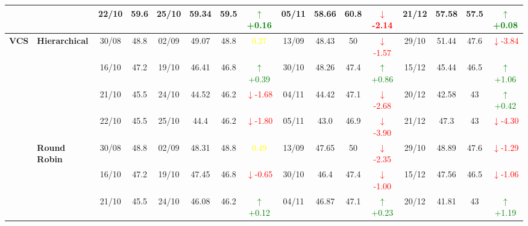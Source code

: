\documentclass{ieeeaccess}
\begin{document}
{\begin{longtable}{llcc|cccc|cccc|cccc}
&
& 22/10 & 59.6 & 25/10 & 59.34 & 59.5 & \textcolor{green}{\(\uparrow\)+0.16} & 05/11 & 58.66 & 60.8 & \textcolor{red}{\(\downarrow\)-2.14} & 21/12 & 57.58 & 57.5 & \textcolor{green}{\(\uparrow\)+0.08} \\
\midrule



\multirow{12}{*}{\textbf{VCS}} 
& \textbf{Hierarchical}
& 30/08 & 48.8 & 02/09 & 49.07 & 48.8 & \textcolor{yellow}{0.27} & 13/09 & 48.43 & 50 & \textcolor{red}{\(\downarrow\)-1.57} & 29/10 & 51.44 & 47.6 & \textcolor{red}{\(\downarrow\)-3.84} \\

&
& 16/10 & 47.2 & 19/10 & 46.41 & 46.8 & \textcolor{green}{\(\uparrow\)+0.39} & 30/10 & 48.26 & 47.4 & \textcolor{green}{\(\uparrow\)+0.86} & 15/12 & 45.44 & 46.5 & \textcolor{green}{\(\uparrow\)+1.06} \\

&
& 21/10 & 45.5 & 24/10 & 44.52 & 46.2 & \textcolor{red}{\(\downarrow\)-1.68} & 04/11 & 44.42 & 47.1 & \textcolor{red}{\(\downarrow\)-2.68} & 20/12 & 42.58 & 43 & \textcolor{green}{\(\uparrow\)+0.42} \\

&
& 22/10 & 45.5 & 25/10 & 44.4 & 46.2 & \textcolor{red}{\(\downarrow\)-1.80} & 05/11 & 43.0 & 46.9 & \textcolor{red}{\(\downarrow\)-3.90} & 21/12 & 47.3 & 43 & \textcolor{red}{\(\downarrow\)-4.30} \\
\cmidrule(lr){2-16}


& \textbf{Round Robin}
& 30/08 & 48.8 & 02/09 & 48.31 & 48.8 & \textcolor{yellow}{0.49} & 13/09 & 47.65 & 50 & \textcolor{red}{\(\downarrow\)-2.35} & 29/10 & 48.89 & 47.6 & \textcolor{red}{\(\downarrow\)-1.29} \\

&
& 16/10 & 47.2 & 19/10 & 47.45 & 46.8 & \textcolor{red}{\(\downarrow\)-0.65} & 30/10 & 46.4 & 47.4 & \textcolor{red}{\(\downarrow\)-1.00} & 15/12 & 47.56 & 46.5 & \textcolor{red}{\(\downarrow\)-1.06} \\

&
& 21/10 & 45.5 & 24/10 & 46.08 & 46.2 & \textcolor{green}{\(\uparrow\)+0.12} & 04/11 & 46.87 & 47.1 & \textcolor{green}{\(\uparrow\)+0.23} & 20/12 & 41.81 & 43 & \textcolor{green}{\(\uparrow\)+1.19} \\


\end{longtable}}
\end{document}
